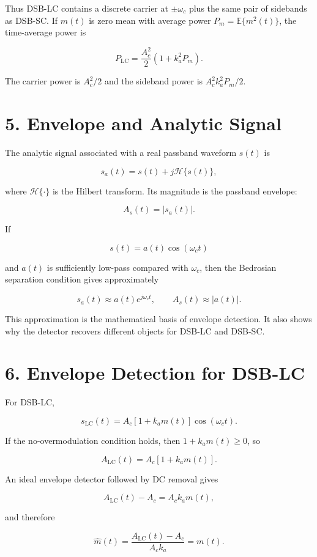 \documentclass[11pt]{article}
\begin{document}
Thus DSB-LC contains a discrete carrier at $\pm\omega_c$ plus the same pair of sidebands as DSB-SC. If $m(t)$ is zero mean with average power $P_m=\mathbb{E}\{m^2(t)\}$, the time-average power is

\[
P_{\mathrm{LC}}=\frac{A_c^2}{2}\left(1+k_a^2P_m\right).
\]

The carrier power is $A_c^2/2$ and the sideband power is $A_c^2k_a^2P_m/2$.

\section{5. Envelope and Analytic Signal}

The analytic signal associated with a real passband waveform $s(t)$ is

\[
s_a(t)=s(t)+j\mathcal{H}\{s(t)\},
\]

where $\mathcal{H}\{\cdot\}$ is the Hilbert transform. Its magnitude is the passband envelope:

\[
A_s(t)=|s_a(t)|.
\]

If

\[
s(t)=a(t)\cos(\omega_c t)
\]

and $a(t)$ is sufficiently low-pass compared with $\omega_c$, then the Bedrosian separation condition gives approximately

\[
s_a(t)\approx a(t)e^{j\omega_c t},
\qquad
A_s(t)\approx |a(t)|.
\]

This approximation is the mathematical basis of envelope detection. It also shows why the detector recovers different objects for DSB-LC and DSB-SC.

\section{6. Envelope Detection for DSB-LC}

For DSB-LC,

\[
s_{\mathrm{LC}}(t)=A_c\left[1+k_a m(t)\right]\cos(\omega_c t).
\]

If the no-overmodulation condition holds, then $1+k_a m(t)\geq 0$, so

\[
A_{\mathrm{LC}}(t)=A_c\left[1+k_a m(t)\right].
\]

An ideal envelope detector followed by DC removal gives

\[
A_{\mathrm{LC}}(t)-A_c=A_c k_a m(t),
\]

and therefore

\[
\widehat{m}(t)=\frac{A_{\mathrm{LC}}(t)-A_c}{A_c k_a}=m(t).
\]
\end{document}
